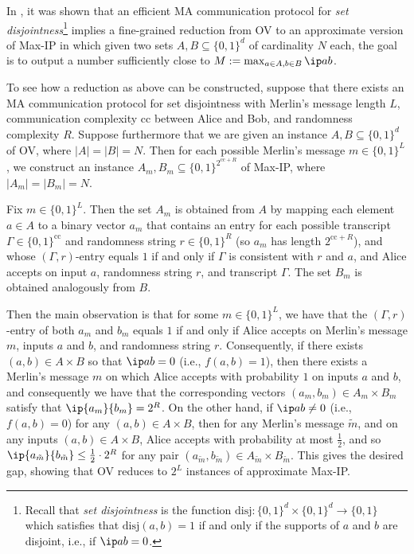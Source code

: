 \documentclass[11pt]{article}
\theoremstyle{plain}
\theoremstyle{remark}
\newcommand{\cc}{\mathrm{cc}}
\begin{document}
In \cite{ARW17}, it was shown that an efficient MA communication protocol for \emph{set disjointness}\footnote{Recall that \emph{set disjointness} is the function $\mathrm{disj}:\{0,1\}^d \times \{0,1\}^d \to \{0,1\}$ which satisfies that $
\mathrm{disj}(a,b)=1$ if and only if the supports of $a$ and $b$ are disjoint, i.e., if $\ip a b =0$.} implies a fine-grained reduction from OV to an approximate version of Max-IP in which given two sets $A, B\subseteq\{0,1\}^d$ of cardinality $N$ each, the goal is to output a number sufficiently close to $M:=\max_{a \in A, b \in B} \ip a b$.

To see how a reduction as above can be constructed, suppose that there exists an MA communication protocol for set disjointness with Merlin's message length $L$, communication complexity $\cc$ between Alice and Bob, and randomness complexity $R$. Suppose furthermore that we are given an instance $A,B \subseteq \{0,1\}^d$ of OV, where $|A|=|B|=N$. Then for each possible Merlin's message $m \in \{0,1\}^L$, we construct an instance $A_m,B_m \subseteq \{0,1\}^{ 2^{\cc+R} }$ of Max-IP, where $|A_m| = |B_m|=N$.

Fix $m \in \{0,1\}^L$. Then the set $A_m$ is obtained from $A$ by mapping each element $a \in A$  to a binary vector $a_m$ that contains an entry for each possible transcript $\Gamma \in \{0,1\}^{\cc}$ and randomness string $r \in \{0,1\}^R$ (so $a_m$ has length $2^{\cc+R}$), and whose $(\Gamma, r)$-entry equals $1$ if and only if $\Gamma$ is consistent with $r$ and $a$, and Alice accepts on input $a$, randomness string $r$, and transcript $\Gamma$.
The set $B_m$ is obtained analogously from $B$. 

Then the main observation is that for some $m \in \{0,1\}^L$, we have that the $(\Gamma,r)$-entry of both $a_m$ and $b_m$ equals $1$ if and only if Alice accepts on Merlin's message $m$, inputs $a$ and $b$, and randomness string $r$. Consequently, if there exists $(a,b) \in A \times B$ so that $\ip a b =0$ (i.e., $f(a,b)=1$), then there exists a Merlin's message $m$ on which Alice accepts with probability $1$ on inputs $a$ and $b$, and consequently we have that the corresponding vectors
$(a_m,b_m) \in A_m \times B_m$ satisfy that $\ip {a_m} {b_m} = 2^R$. 
On the other hand, if 
$\ip a b \neq 0$ (i.e., $f(a,b) =0$) for any $(a,b) \in A \times B$, then for any Merlin's message $\tilde m$, and on any inputs $(a,b) \in A \times B$, Alice accepts with probability at most $\frac 1 2$, and so $\ip {a_{\tilde m}} {b_{\tilde m}} \leq \frac 1 2 \cdot 2^R$ for any pair
$(a_{\tilde m},b_{\tilde m}) \in A_{\tilde m} \times B_{\tilde m}$. This gives the desired gap, showing that OV reduces to $2^L$ instances of approximate Max-IP. 
\end{document}
